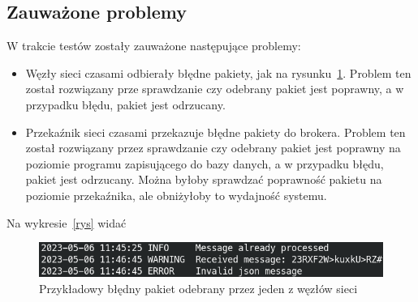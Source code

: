 \subsection{Zauważone problemy}
W trakcie testów zostały zauważone następujące problemy:
\begin{itemize}
    \item Węzły sieci czasami odbierały błędne pakiety, jak na rysunku~\ref{rys:zly-pakiet}. Problem ten został rozwiązany prze sprawdzanie czy odebrany pakiet jest poprawny, a w przypadku błędu, pakiet jest odrzucany.
    \item Przekaźnik sieci czasami przekazuje błędne pakiety do brokera. Problem ten został rozwiązany przez sprawdzanie czy odebrany pakiet jest poprawny na poziomie programu zapisującego do bazy danych, a w przypadku błędu, pakiet jest odrzucany. Można byłoby sprawdzać poprawność pakietu na poziomie przekaźnika, ale obniżyłoby to wydajność systemu.
\end{itemize}


Na wykresie~\ref{rys} widać

\begin{figure}[b!]
    \begin{center}
        \includegraphics[width=13cm]{pic/zly-pakiet.png}
    \end{center}
    \caption{Przykładowy błędny pakiet odebrany przez jeden z węzłów sieci}\label{rys:zly-pakiet}
\end{figure}
